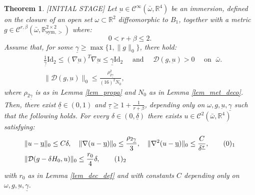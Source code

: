 \documentclass[reqno,twoside,11pt]{amsart}
\newcommand{\sym}{\mathrm{sym}}
\newcommand{\Id}{\mathrm{Id}}
\newcommand{\R}{\mathbb{R}}
\numberwithin{equation}{section}
\theoremstyle{plain}
\newtheorem{theorem}{Theorem}[section]
\theoremstyle{definition}
\begin{document}
\begin{theorem}\label{lem_stage0} \textup{[INITIAL STAGE]}
Let $\underbar u\in\mathcal{C}^\infty(\bar\omega, \R^4)$ be an
immersion, defined on the closure of an open set $\omega\subset\R^2$ diffeomorphic to $B_1$,
together with a metric $g\in \mathcal{C}^{r,\beta}(\bar\omega,
\R^{2\times 2}_{\sym, >})$ where:
$$0<r+\beta\leq 2.$$
Assume that, for some $\underline\gamma\geq \max\{1,\|g\|_0\}$, there hold:
\begin{equation*}
\begin{split}
&\frac{1}{\underline \gamma} \Id_2\leq (\nabla \underbar u)^T\nabla
\underbar u \leq \underline\gamma\Id_2 \quad\mbox{ and } \quad    
\mathcal{D}(g,\underbar u)>0 \quad\mbox{ on } \;\bar\omega.
\\ & \|\mathcal{D}(g,\underbar u)\|_0\leq \frac{\rho_{2\underline\gamma}^2}{(16)^2 N_0},
\end{split}
\end{equation*}
where $\rho_{2\underline\gamma}$ is as in Lemma \ref{lem_propa} and
$N_0$ as in Lemma \ref{lem_met_deco}.
Then, there exist  $\underline\delta \in (0,1)$ and
$\underline \tau\geq 1+\frac{1}{r+\beta}$, depending only on $\omega,
g, \underbar u, \underline\gamma $ such that the following holds. For every
$\delta\in (0,\underline\delta)$ there exists $u\in\mathcal{C}^2(\bar\omega,\R^4)$ satisfying:
\begin{align*}
& \|u-\underbar u\|_0\leq C\delta, \quad \|\nabla (u-\underbar
u)\|_0\leq \frac{\rho_{2\underline\gamma}}{3}, \quad
\|\nabla^2(u-\underbar u)\|_0\leq \frac{C}{\delta^{\underline\tau}},  
\tag*{(\theequation)$_1$}\refstepcounter{equation} \label{step0_1} \\
& \|\mathcal{D}(g-\delta H_0, u)\|_0\leq \frac{r_0}{4}\delta, 
\tag*{(\theequation)$_2$} \label{step0_2}
\end{align*}
with $r_0$ as in Lemma \ref{lem_dec_def} and with constants 
$C$ depending only on $\omega, g, \underbar u, \underline\gamma$.
\end{theorem}

\medskip


\smallskip
\end{document}
